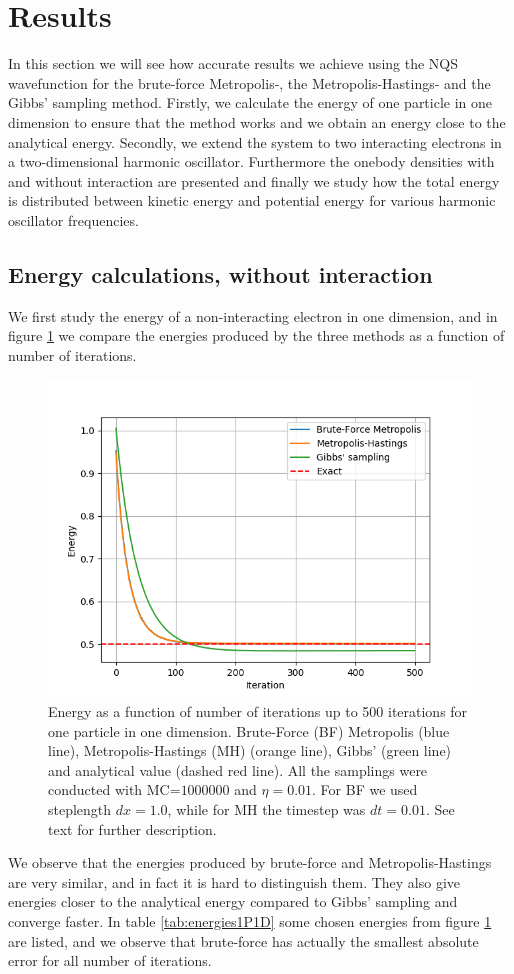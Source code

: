 \documentclass[norsk,a4paper,12pt]{article}
\begin{document}
\section{Results} \label{sec:Results}
In this section we will see how accurate results we achieve using the NQS wavefunction for the brute-force Metropolis-, the Metropolis-Hastings- and the Gibbs' sampling method. Firstly, we calculate the energy of one particle in one dimension to ensure that the method works and we obtain an energy close to the analytical energy. Secondly, we extend the system to two interacting electrons in a two-dimensional harmonic oscillator. Furthermore the onebody densities with and without interaction are presented and finally we study how the total energy is distributed between kinetic energy and potential energy for various harmonic oscillator frequencies. 

\subsection{Energy calculations, without interaction}
We first study the energy of a non-interacting electron in one dimension, and in figure \ref{fig:energy1P1D} we compare the energies produced by the three methods as a function of number of iterations. 
 \begin{figure} [H]
 	\centering
 	\includegraphics[scale=0.6]{plots/comparison_1P_MC_1000000_eta_001_iter_500.png}
 	\caption{Energy as a function of number of iterations up to 500 iterations for one particle in one dimension. Brute-Force (BF) Metropolis (blue line), Metropolis-Hastings (MH) (orange line), Gibbs' (green line) and analytical value (dashed red line). All the samplings were conducted with MC=$1000000$ and $\eta=0.01$. For BF we used steplength $dx=1.0$, while for MH the timestep was $dt=0.01$. See text for further description.}
 	\label{fig:energy1P1D}
 \end{figure}
We observe that the energies produced by brute-force and Metropolis-Hastings are very similar, and in fact it is hard to distinguish them. They also give energies closer to the analytical energy compared to Gibbs' sampling and converge faster. In table \ref{tab:energies1P1D} some chosen energies from figure \ref{fig:energy1P1D} are listed, and we observe that brute-force has actually the smallest absolute error for all number of iterations. 
\end{document}
